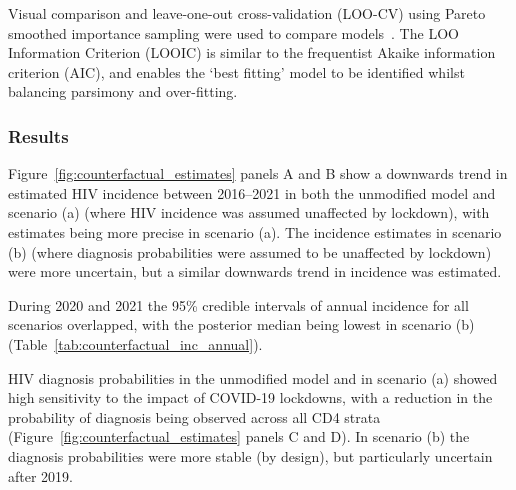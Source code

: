 Visual comparison and leave-one-out cross-validation (LOO-CV) using Pareto smoothed importance sampling were used to compare models~\parencite{Vehtari2024-qb}. The LOO Information Criterion (LOOIC) is similar to the frequentist Akaike information criterion (AIC), and enables the `best fitting' model to be identified whilst balancing parsimony and over-fitting.

\subsubsection{Results}

Figure~\ref{fig:counterfactual_estimates} panels A and B show a downwards trend in estimated HIV incidence between 2016--2021 in both the unmodified model and scenario (a) (where HIV incidence was assumed unaffected by lockdown), with estimates being more precise in scenario (a). The incidence estimates in scenario (b) (where diagnosis probabilities were assumed to be unaffected by lockdown) were more uncertain, but a similar downwards trend in incidence was estimated.

During 2020 and 2021 the 95\% credible intervals of annual incidence for all scenarios overlapped, with the posterior median being lowest in scenario (b) (Table~\ref{tab:counterfactual_inc_annual}).



HIV diagnosis probabilities in the unmodified model and in scenario (a) showed high sensitivity to the impact of COVID-19 lockdowns, with a reduction in the probability of diagnosis being observed across all CD4 strata (Figure~\ref{fig:counterfactual_estimates} panels C and D). In scenario (b) the diagnosis probabilities were more stable (by design), but particularly uncertain after 2019.

